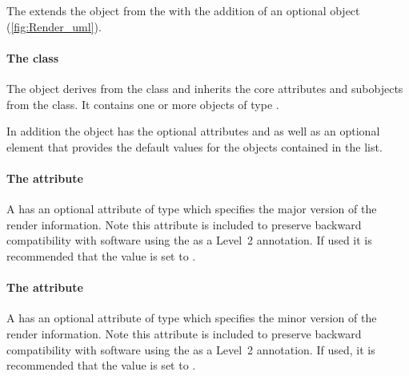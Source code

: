 The \RenderPackage extends the  object from the \LayoutPackage with the addition
of an optional  \ListOfLocalRenderInformation object (\ref{fig:Render_uml}).

\paragraph{The  class}
\label{listoflocalrenderinformation-class}

The \ListOfLocalRenderInformation object derives from the  class
and inherits the core attributes and subobjects from the 
class. It contains one or more objects of type \LocalRenderInformation.

In addition the \ListOfLocalRenderInformation object has the optional
attributes  and  as well as an optional
\DefaultValues element that provides the default values for the 
\LocalRenderInformation objects contained in the list.

\paragraph{The \fixttspace{} attribute}

A \ListOfLocalRenderInformation has an optional attribute
 of type  which specifies the major version of the render information.  Note this attribute is included to preserve backward compatibility with software using the \RenderPackage as a Level~2 annotation. If used it is recommended that the value is set to .
 
\paragraph{The \fixttspace{} attribute}

A \ListOfLocalRenderInformation has an optional attribute
 of type  which specifies the minor version of the render information.  Note this attribute is included to preserve backward compatibility with software using the \RenderPackage as a Level~2 annotation. If used, it is recommended that the value is set to .
 
